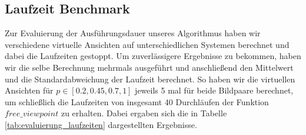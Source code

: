 \subsection{Laufzeit Benchmark}
Zur Evaluierung der Ausführungsdauer unseres Algorithmus haben wir verschiedene virtuelle Ansichten auf unterschiedlichen Systemen berechnet und dabei die Laufzeiten gestoppt. Um zuverlässigere Ergebnisse zu bekommen, haben wir die selbe Berechnung mehrmals ausgeführt und anschließend den Mittelwert und die Standardabweichung der Laufzeit berechnet. So haben wir die virtuellen Ansichten für $p \in [0.2, 0.45, 0.7, 1]$ jeweils 5 mal für beide Bildpaare berechnet, um schließlich die Laufzeiten von insgesamt 40 Durchläufen der Funktion $free\_viewpoint$ zu erhalten. Dabei ergaben sich die in Tabelle \ref{tab:evaluierung_laufzeiten} dargestellten Ergebnisse.

